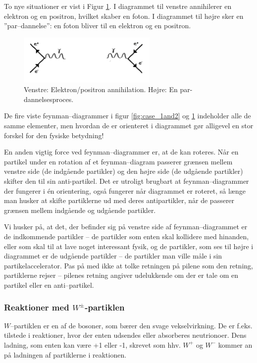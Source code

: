 To nye situationer er vist i Figur \ref{fig:case_3and4}. I diagrammet
til venstre annihilerer en elektron og en positron, hvilket skaber en
foton. I diagrammet til højre sker en ''par--dannelse'': en foton
bliver til en elektron og en positron.
\begin{figure}[h!]
  \centering
  \includegraphics[width=0.6\textwidth]{KernePartikel/fig_p/case_3and42.png}
  \caption{ Venstre: Elektron/positron annihilation. Højre: En
      par-dannelsesproces.}
  \label{fig:case_3and4}
\end{figure}
De fire viste feynman--diagrammer i figur \ref{fig:case_1and2} og
\ref{fig:case_3and4} indeholder alle de samme elementer, men hvordan de
er orienteret i diagrammet gør alligevel en stor forskel for den
fysiske betydning!  

En anden vigtig force ved feynman--diagrammer er, at de kan roteres. Når en partikel under en rotation af et feynman--diagram passerer grænsen mellem venstre side (de indgående partikler) og den højre side (de udgående partikler) skifter den til sin anti-partikel. Det er utroligt brugbart at feynman--diagrammer der fungerer i én orientering, også fungerer når diagrammet er roteret, så længe man husker at skifte partiklerne ud med deres antipartikler, når de passerer grænsen mellem indgående og udgående partikler.

Vi husker på, at det, der befinder sig på venstre
side af feynman--diagrammet er de indkommende partikler -- de partikler
som enten skal kollidere med hinanden, eller som skal til at lave noget
interessant fysik, og de partikler, som ses til højre i diagrammet er
de udgående partikler -- de partikler man ville måle i sin
partikelaccelerator. Pas på med ikke at tolke retningen på pilene som
den retning, partiklerne rejser -- pilenes retning angiver udelukkende
om der er tale om en partikel eller en anti--partikel.

\subsubsection{Reaktioner med $W^{\pm}$-partiklen}

$W$--partiklen er en af de bosoner, som bærer den svage vekselvirkning. De er f.eks. tilstede i reaktioner, hvor der enten udsendes eller absorberes neutrionoer. Dens ladning, som enten kan være +1 eller -1, skrevet som hhv. $W^+$ og $W^-$ kommer an på ladningen af partiklerne i reaktionen. 

